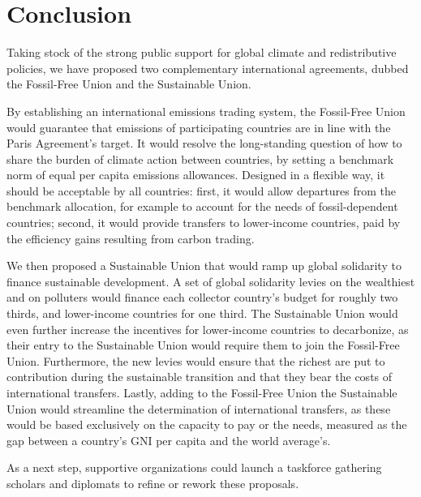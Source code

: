 \documentclass[12pt,english]{article}
\begin{document}


\clearpage

\section*{Conclusion}

Taking stock of the strong public support for global climate and redistributive policies,\cite{fabre_majority_2025} we have proposed two complementary international agreements, dubbed the Fossil-Free Union and the Sustainable Union. 

By establishing an international emissions trading system, the Fossil-Free Union would guarantee that emissions of participating countries are in line with the Paris Agreement's target. It would resolve the long-standing question of how to share the burden of climate action between countries, by setting a benchmark norm of equal per capita emissions allowances. Designed in a flexible way, it should be acceptable by all countries: first, it would allow departures from the benchmark allocation, for example to account for the needs of fossil-dependent countries; second, it would provide transfers to lower-income countries, paid by the efficiency gains resulting from carbon trading.

We then proposed a Sustainable Union that would ramp up global solidarity to finance sustainable development. A set of global solidarity levies on the wealthiest and on polluters would finance each collector country's budget for roughly two thirds, and lower-income countries for one third. 
The Sustainable Union would even further increase the incentives for lower-income countries to decarbonize, as their entry to the Sustainable Union would require them to join the Fossil-Free Union. Furthermore, the new levies would ensure that the richest are put to contribution during the sustainable transition and that they bear the costs of international transfers. Lastly, adding to the Fossil-Free Union the Sustainable Union would streamline the determination of international transfers, as these would be based exclusively on the capacity to pay or the needs, measured as the gap between a country's GNI per capita and the world average's.

As a next step, supportive organizations could launch a taskforce gathering scholars and diplomats to refine or rework these proposals.


\end{document}
